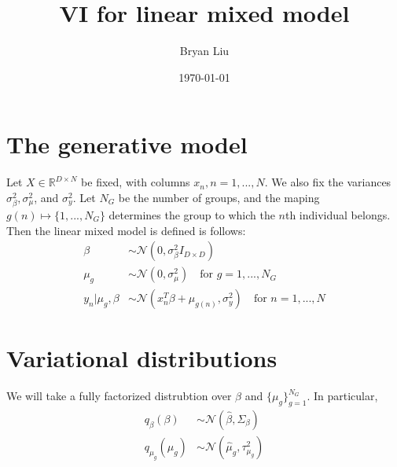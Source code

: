 \documentclass[10pt]{article}
\theoremstyle{plain}
\theoremstyle{definition}
\newcommand\reals{{\mathbb R}}
\newcommand{\<}{\langle}
\renewcommand{\>}{\rangle}
\begin{document}
%

\title{VI for linear mixed model}
\author{Bryan Liu}


\date{\today}

\maketitle



\section{The generative model}
Let $X\in \reals^{D\times N}$ be fixed, with columns $x_n, n = 1,..., N$. We also fix the variances $\sigma^2_\beta, \sigma^2_\mu$, and $\sigma^2_y$. Let $N_G$ be the number of groups, and the maping $g(n)\mapsto \{1, ..., N_G\}$ determines the group to which the $n$th individual belongs. Then the linear mixed model is defined is follows: 
\begin{align}
\beta &\sim \mathcal N(0, \sigma^2_\beta I_{D\times D})\\
\mu_g &\sim \mathcal N(0, \sigma^2_\mu) \quad \text{for $g= 1, ..., N_G$} \\
y_n | \mu_g, \beta &\sim \mathcal N (x_n^T\beta + \mu_{g(n)}, \sigma^2_y)\quad \text{for $n = 1, ..., N$}
\end{align}

\section{Variational distributions}
We will take a fully factorized distrubtion over $\beta$ and $\{\mu_g\}_{g=1}^{N_G}$. In particular, 
\begin{align}
q_\beta(\beta) &\sim \mathcal N (\hat \beta, \Sigma_\beta)\\
q_{\mu_g}(\mu_g) &\sim \mathcal{N}(\hat\mu_g, \tau^2_{\mu_g})
\end{align}
\end{document}
